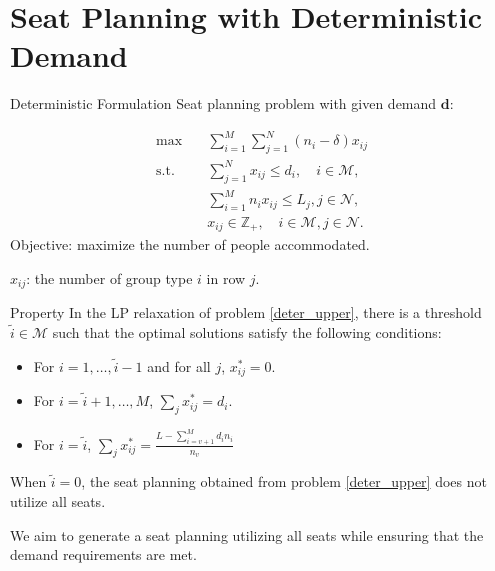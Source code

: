 
\section{Seat Planning with Deterministic Demand}
    \frame{\sectionpage}

  \begin{frame}{Deterministic Formulation}  %
    Seat planning problem with given demand $\bm{d}$:

    \begin{equation}\label{deter_upper}
      \begin{aligned}
      \max \quad & \sum_{i=1}^{M}  \sum_{j= 1}^{N} (n_i- \delta) x_{ij} \\
      \text {s.t.} \quad & \sum_{j= 1}^{N} x_{ij} \leq d_{i}, \quad i \in \mathcal{M}, \\
      & \sum_{i=1}^{M} n_{i} x_{ij} \leq L_j, j \in \mathcal{N}, \\
      & x_{ij} \in \mathbb{Z}_{+}, \quad i \in \mathcal{M}, j \in \mathcal{N}.
      \end{aligned}
    \end{equation}
    Objective: maximize the number of people accommodated.

    $x_{ij}$: the number of group type $i$ in row $j$.
  \end{frame}

  \begin{frame}{Property}
    In the LP relaxation of problem \eqref{deter_upper}, there is a threshold $\tilde{i} \in \mathcal{M}$ such that the optimal solutions satisfy the following conditions:

    \begin{itemize}
      \item For $i = 1,\ldots, \tilde{i} -1$ and for all $j$, $x_{ij}^{*} = 0$. 
      \item For $i = \tilde{i} +1,\ldots, M$, $\sum_{j} x_{ij}^{*} = d_{i}$. 

      \item For $i = \tilde{i}$, $\sum_{j} x_{ij}^{*} = \frac{L - \sum_{i = v+1}^{M} {d_i n_i}}{n_v}$ 
    \end{itemize}

    \vspace{0.5cm}
    When $\tilde{i} =0$, the seat planning obtained from problem \eqref{deter_upper} does not utilize all seats.
    \vspace{0.5cm}

    We aim to generate a seat planning utilizing all seats while ensuring that the demand requirements are met.
  \end{frame}

